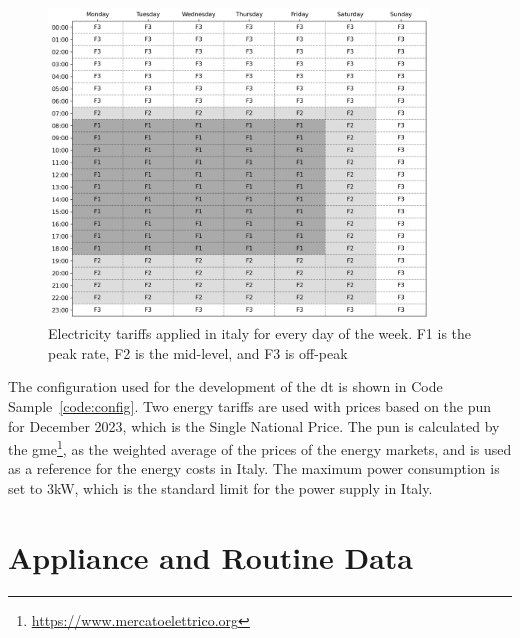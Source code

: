 \begin{figure}
    \centering
    \includegraphics[width=0.9\textwidth]{images/costs.png}
    \caption[Electricity tariffs applied in italy for every day of the week]{Electricity tariffs applied in italy for every day of the week. F1 is the peak rate, F2 is the mid-level, and F3 is off-peak}%
    \label{fig:costs_matrix}%
\end{figure}

The configuration used for the development of the \acrshort{dt} is shown in Code Sample~\ref{code:config}. Two energy tariffs are used with prices based on the \acrfull{pun} for December 2023, which is the Single National Price. The \acrshort{pun} is calculated by the \acrfull{gme}\footnote{\url{https://www.mercatoelettrico.org}}, as the weighted average of the prices of the energy markets, and is used as a reference for the energy costs in Italy. The maximum power consumption is set to 3kW, which is the standard limit for the power supply in Italy.

\section{Appliance and Routine Data}

